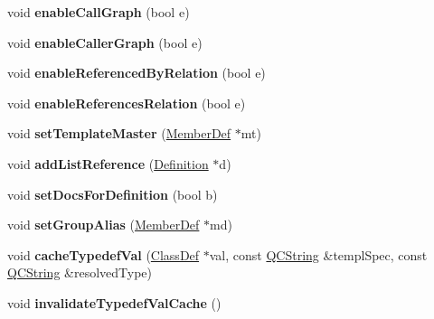\begin{DoxyCompactItemize}
\item 
\mbox{\label{class_member_def_ab47df482582383584ba4317a78b0f9a4}} 
void {\bfseries enable\+Call\+Graph} (bool e)
\item 
\mbox{\label{class_member_def_a2636eed17da2f4fbb5e21e539429057c}} 
void {\bfseries enable\+Caller\+Graph} (bool e)
\item 
\mbox{\label{class_member_def_a513830fed766d23bc923b088ac0a5f5b}} 
void {\bfseries enable\+Referenced\+By\+Relation} (bool e)
\item 
\mbox{\label{class_member_def_aec5625604c5eb78401c81d4e9fad5d71}} 
void {\bfseries enable\+References\+Relation} (bool e)
\item 
\mbox{\label{class_member_def_a329e8f937a85c720897c571c48eec2eb}} 
void {\bfseries set\+Template\+Master} (\mbox{\hyperlink{class_member_def}{Member\+Def}} $\ast$mt)
\item 
\mbox{\label{class_member_def_a6e41c3e69f5dbd82a5f52e384993b4a3}} 
void {\bfseries add\+List\+Reference} (\mbox{\hyperlink{class_definition}{Definition}} $\ast$d)
\item 
\mbox{\label{class_member_def_a6af8024c45cb6bf279dec24f9be43ff7}} 
void {\bfseries set\+Docs\+For\+Definition} (bool b)
\item 
\mbox{\label{class_member_def_ac3303d13571e2eaf0c19e2d86d101ef2}} 
void {\bfseries set\+Group\+Alias} (\mbox{\hyperlink{class_member_def}{Member\+Def}} $\ast$md)
\item 
\mbox{\label{class_member_def_a828b5a44411f89b7cad45a1f20ff1bd7}} 
void {\bfseries cache\+Typedef\+Val} (\mbox{\hyperlink{class_class_def}{Class\+Def}} $\ast$val, const \mbox{\hyperlink{class_q_c_string}{Q\+C\+String}} \&templ\+Spec, const \mbox{\hyperlink{class_q_c_string}{Q\+C\+String}} \&resolved\+Type)
\item 
\mbox{\label{class_member_def_a9dbccfff3e6e5f29d892c351641e0c3e}} 
void {\bfseries invalidate\+Typedef\+Val\+Cache} ()

\end{DoxyCompactItemize}
